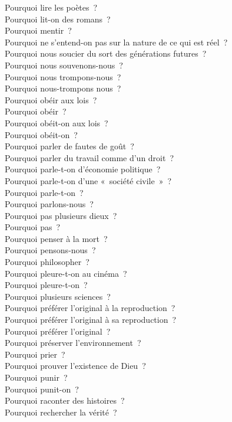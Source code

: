 \documentclass[a4paper,12pt]{article}
\begin{document}
Pourquoi lire les poètes ? \\
Pourquoi lit-on des romans ? \\
Pourquoi mentir ? \\
Pourquoi ne s'entend-on pas sur la nature de ce qui est réel ? \\
Pourquoi nous soucier du sort des générations futures ? \\
Pourquoi nous souvenons-nous ? \\
Pourquoi nous trompons-nous ? \\
Pourquoi nous-trompons nous ? \\
Pourquoi obéir aux lois ? \\
Pourquoi obéir ? \\
Pourquoi obéit-on aux lois ? \\
Pourquoi obéit-on ? \\
Pourquoi parler de fautes de goût ? \\
Pourquoi parler du travail comme d'un droit ? \\
Pourquoi parle-t-on d'économie politique ? \\
Pourquoi parle-t-on d'une « société civile » ? \\
Pourquoi parle-t-on ? \\
Pourquoi parlons-nous ? \\
Pourquoi pas plusieurs dieux ? \\
Pourquoi pas ? \\
Pourquoi penser à la mort ? \\
Pourquoi pensons-nous ? \\
Pourquoi philosopher ? \\
Pourquoi pleure-t-on au cinéma ? \\
Pourquoi pleure-t-on ? \\
Pourquoi plusieurs sciences ? \\
Pourquoi préférer l'original à la reproduction ? \\
Pourquoi préférer l'original à sa reproduction ? \\
Pourquoi préférer l'original ? \\
Pourquoi préserver l'environnement ? \\
Pourquoi prier ? \\
Pourquoi prouver l'existence de Dieu ? \\
Pourquoi punir ? \\
Pourquoi punit-on ? \\
Pourquoi raconter des histoires ? \\
Pourquoi rechercher la vérité ? \\
\end{document}
